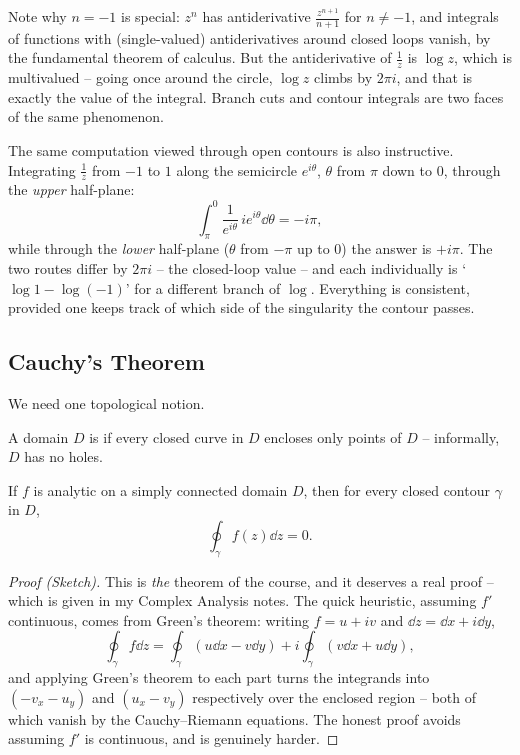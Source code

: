 \documentclass[a4paper]{scrartcl}
\begin{document}
Note why $n = -1$ is special: $z^n$ has antiderivative $\frac{z^{n+1}}{n+1}$ for $n \neq -1$, and integrals of functions with (single-valued) antiderivatives around closed loops vanish, by the fundamental theorem of calculus. But the antiderivative of $\frac 1z$ is $\log z$, which is multivalued -- going once around the circle, $\log z$ climbs by $2\pi i$, and that is exactly the value of the integral. Branch cuts and contour integrals are two faces of the same phenomenon.

The same computation viewed through open contours is also instructive. Integrating $\frac 1z$ from $-1$ to $1$ along the semicircle $e^{i\theta}$, $\theta$ from $\pi$ down to $0$, through the \emph{upper} half-plane:
$$
\int_\pi^0 \frac{1}{e^{i\theta}} \, ie^{i\theta} \dd \theta = -i\pi,
$$
while through the \emph{lower} half-plane ($\theta$ from $-\pi$ up to $0$) the answer is $+i\pi$. The two routes differ by $2\pi i$ -- the closed-loop value -- and each individually is `$\log 1 - \log(-1)$' for a different branch of $\log$. Everything is consistent, provided one keeps track of which side of the singularity the contour passes.

\subsection{Cauchy's Theorem}

We need one topological notion.

\begin{definition}
	A domain $D$ is  if every closed curve in $D$ encloses only points of $D$ -- informally, $D$ has no holes.
\end{definition}

\begin{theorem}
	If $f$ is analytic on a simply connected domain $D$, then for every closed contour $\gamma$ in $D$,
	$$
	\oint_\gamma f(z) \dd z = 0.
	$$
\end{theorem}
\begin{proof}[Proof (Sketch)]
	This is \emph{the} theorem of the course, and it deserves a real proof -- which is given in my Complex Analysis notes. The quick heuristic, assuming $f'$ continuous, comes from Green's theorem: writing $f = u + iv$ and $\dd z = \dd x + i \dd y$,
	$$
	\oint_\gamma f \dd z = \oint_\gamma (u \dd x - v \dd y) + i \oint_\gamma (v \dd x + u \dd y),
	$$
	and applying Green's theorem to each part turns the integrands into $(-v_x - u_y)$ and $(u_x - v_y)$ respectively over the enclosed region -- both of which vanish by the Cauchy--Riemann equations. The honest proof avoids assuming $f'$ is continuous, and is genuinely harder.
\end{proof}
\end{document}
